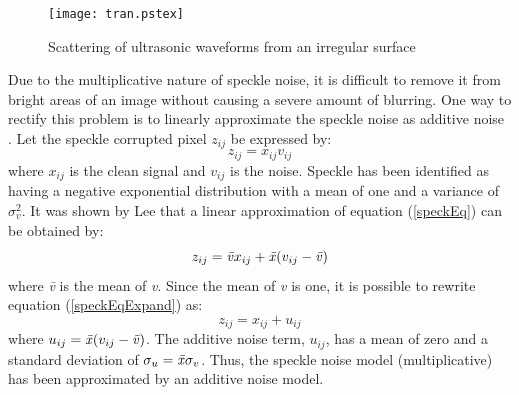 \documentclass[12pt]{report}
\begin{document}

\begin{figure}[htb]
	\begin{center}
		\texttt{[image: tran.pstex]}
		\caption{Scattering of ultrasonic waveforms from an irregular surface}
		\label{speckleFig}
	\end{center}
\end{figure}


Due to the multiplicative nature of speckle noise, it is difficult to remove it
from bright areas of an image without causing a severe amount of blurring. 
One way to rectify this problem is to linearly approximate the speckle noise as additive noise \cite{yu96}.
Let the speckle corrupted pixel $z_{ij}$ be expressed by:
\begin{equation}
	z_{ij} = x_{ij}v_{ij}
	\label{speckEq}
\end{equation}
where $x_{ij}$ is the clean signal and $v_{ij}$ is the noise.
Speckle has been identified as having a negative exponential 
distribution \cite{goodman75} with a mean of one and a variance of
$\sigma_{v}^{2}$. It was shown by Lee \cite{lee80} that a linear 
approximation of equation (\ref{speckEq}) can be obtained by:
\begin{equation}
	z_{ij} = \mbox{\emph{\={v}}} x_{ij} + \mbox{\emph{\={x}}} (v_{ij} - \mbox{\emph{\={v}}})
	\label{speckEqExpand}
\end{equation}
where \emph{\={v}} is the mean of \emph{v}. Since the mean of \emph{v} is one, 
it is possible to rewrite equation (\ref{speckEqExpand}) as:
\begin{equation}
	z_{ij} = x_{ij} + u_{ij}
\end{equation}
where $u_{ij} = \mbox{\emph{\={x}}}(v_{ij} - \mbox{\emph{\={v}}})$.
The additive noise term, $u_{ij}$, has a mean of zero and a standard
deviation of $\sigma_{u} = \mbox{\emph{\={x}}} \sigma_{v}$.
Thus, the speckle noise model (multiplicative) has been approximated by an additive noise model.
\end{document}
